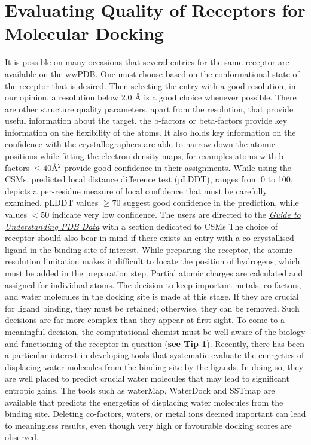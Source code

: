 \chapter*{Evaluating Quality of Receptors for Molecular Docking}

It is possible on many occasions that several entries for the same receptor are available on the wwPDB. One must choose based on the conformational state of the receptor that is desired. Then selecting the entry with a good resolution, in our opinion, a resolution below 2.0 \r{A} is a good choice whenever possible. There are other structure quality parameters, apart from the resolution, that provide useful information about the target. the b-factors or beta-factors provide key information on the flexibility of the atoms. It also holds key information on the confidence with the crystallographers are able to narrow down the atomic positions while fitting the electron density maps, for examples atoms with b-factors $\le40 $\r{A}$^2$$ $ provide good confidence in their assignments. While using the CSMs, predicted local distance difference test (pLDDT), ranges from 0 to 100, depicts a per-residue measure of local confidence that must be carefully examined. pLDDT values $\ge70$ suggest good confidence in the prediction, while values $<50$ indicate very low confidence. The users are directed to the \href{https://pdb101.rcsb.org/learn/guide-to-understanding-pdb-data/computed-structure-models}{\textit{Guide to Understanding PDB Data}} with a section dedicated to CSMs  The choice of receptor should also bear in mind if there exists an entry with a co-crystallised ligand in the binding site of interest.  While preparing the receptor, the atomic resolution limitation makes it difficult to locate the position of hydrogens, which must be added in the preparation step. Partial atomic charges are calculated and assigned for individual atoms.  The decision to keep important metals, co-factors, and water molecules in the docking site is made at this stage. If they are crucial for ligand binding, they must be retained; otherwise, they can be removed. Such decisions are far more complex than they appear at first sight. To come to a meaningful decision, the computational chemist must be well aware of the biology and functioning of the receptor in question (\textbf{see  Tip 1}). Recently, there has been a particular interest in developing tools that systematic evaluate the energetics of displacing water molecules from the binding site by the ligands. In doing so, they are well placed to predict crucial water molecules that may lead to significant entropic gains. The tools such as  waterMap\cite{bib48, bib49}, WaterDock\cite{bib47} and SSTmap\cite{bib50} are available that predicts the energetics of displacing water molecules from the binding site. Deleting co-factors, waters, or metal ions deemed important can lead to meaningless results, even though very high or favourable docking scores are observed.

